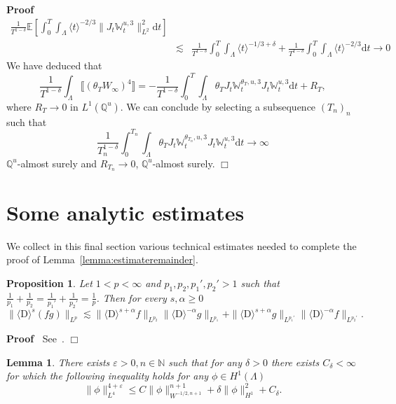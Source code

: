 \documentclass[11pt]{article}
\newcommand{\mathD}{\mathrm{D}}
\newcommand{\mathd}{\mathrm{d}}
\newenvironment{proof}{\noindent\textbf{Proof\ }}{\hspace*{\fill}$\Box$\medskip}
\newtheorem{lemma}{Lemma}
\newtheorem{proposition}{Proposition}
{\theorembodyfont{\rmfamily}\newtheorem{remark}{Remark}}
\begin{document}
\begin{proof}
\begin{eqnarray*}
    \frac{1}{T^{1 - \delta}} \mathbb{E} \left[ \int^T_0 \int_{\Lambda} \langle
    t \rangle^{- 2 / 3} \| J_t \mathbb{W}_t^{u, 3} \|^2_{L^2} \mathd t
    \right]\\
    & \lesssim & \frac{1}{T^{1 - \delta}} \int^T_0 \int_{\Lambda} \langle t
    \rangle^{- 1 / 3 + \delta} + \frac{1}{T^{1 - \delta}} \int^T_0
    \int_{\Lambda} \langle t \rangle^{- 2 / 3} \mathd t \rightarrow 0
  \end{eqnarray*}
  We have deduced that
  \[ \frac{1}{T^{1 - \delta}} \int_{\Lambda} \llbracket (\theta_T
     W_{\infty})^4 \rrbracket = - \frac{1}{T^{1 - \delta}} \int^T_0
     \int_{\Lambda} \theta_T J_t \mathbb{W}_t^{\theta_T, u, 3} J_t
     \mathbb{W}_t^{u, 3} \mathd t + R_T, \]
  where $R_T \rightarrow 0$ in $L^1 (\mathbb{Q}^u)$. We can conclude by
  selecting a subsequence $(T_n)_n$ such that
  \[ \frac{1}{T_n^{1 - \delta}} \int^{T_n}_0 \int_{\Lambda} \theta_T J_t
     \mathbb{W}_t^{\theta_{T_n}, u, 3} J_t \mathbb{W}_t^{u, 3} \mathd t
     \rightarrow \infty \]
  $\mathbb{Q}^u$-almost surely and $R_{T_n} \rightarrow 0$,
  $\mathbb{Q}^u$-almost surely.
\end{proof}

\section{Some analytic estimates }\label{sec:analytic}

We collect in this final section various technical estimates needed to
complete the proof of Lemma~\ref{lemma:estimateremainder}.

\begin{proposition}
  \label{FractionalLeibniz}Let $1 < p < \infty$ and $p_1, p_2, p_1', p_2' > 1$
  such that $\frac{1}{p_1} + \frac{1}{p_2} = \frac{1}{p_1'} + \frac{1}{p_2'} =
  \frac{1}{p}$. Then for every $s, \alpha \geqslant 0$ \
  \[ \| \langle \mathD \rangle^s (f g) \|_{L^p} \lesssim \| \langle \mathD
     \rangle^{s + \alpha} f \|_{L^{p_2}}  \| \langle \mathD \rangle^{- \alpha}
     g \|_{L^{p_1}} + \| \langle \mathD \rangle^{s + \alpha} g \|_{L^{p_1'}} 
     \| \langle \mathD \rangle^{- \alpha} f \|_{L^{p_2'}} . \]
\end{proposition}

\begin{proof}
  See~{\cite{gulisashvili_exact_1996}}.
\end{proof}

\begin{lemma}
  There exists $\varepsilon > 0, n \in \mathbb{N}$ such that for any $\delta >
  0$ there exists $C_{\delta} < \infty$ for which the following inequality
  holds for any $\phi \in H^1 (\Lambda)$ \label{L4estimate}
  \[ \| \phi \|^{4 + \varepsilon}_{L^4} \leqslant C \| \phi \|^{n + 1}_{W^{- 1
     / 2, n + 1}} + \delta \| \phi \|^2_{H^1} + C_{\delta} . \]
\end{lemma}
\end{document}

